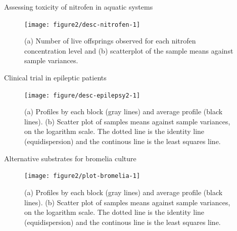 \documentclass[11pt]{beamer}\usepackage[]{graphicx}\usepackage[]{color}
\newenvironment{knitrout}{}{} %
\begin{document}
\begin{frame}{Assessing toxicity of nitrofen in aquatic systems}

\begin{figure}[!htb]

{\centering \texttt{[image: figure2/desc-nitrofen-1]} 

}

\caption[(a) Number of live offsprings observed for each nitrofen concentration level and (b) scatterplot of the sample means against sample variances]{(a) Number of live offsprings observed for each nitrofen concentration level and (b) scatterplot of the sample means against sample variances.}\label{fig:desc-nitrofen}
\end{figure}



\end{frame}

\begin{frame}{Clinical trial in epileptic patients}

\begin{knitrout}
\color{fgcolor}\begin{figure}[!htb]

{\centering \texttt{[image: figure/desc-epilepsy2-1]} 

}

\caption[(a) Profiles by each block (gray lines) and average profile (black lines)]{(a) Profiles by each block (gray lines) and average profile (black lines). (b) Scatter plot of samples means against sample variances, on the logarithm scale. The dotted line is the identity line (equidispersion) and the continous line is the least squares line.}\label{fig:desc-epilepsy2}
\end{figure}


\end{knitrout}

\end{frame}

\begin{frame}{Alternative substrates for bromelia culture}

\begin{figure}[!htb]

{\centering \texttt{[image: figure2/plot-bromelia-1]} 

}

\caption[(a) Profiles by each block (gray lines) and average profile (black lines)]{(a) Profiles by each block (gray lines) and average profile (black lines). (b) Scatter plot of samples means against sample variances, on the logarithm scale. The dotted line is the identity line (equidispersion) and the continous line is the least squares line.}\label{fig:plot-bromelia}
\end{figure}



\end{frame}
\end{document}
